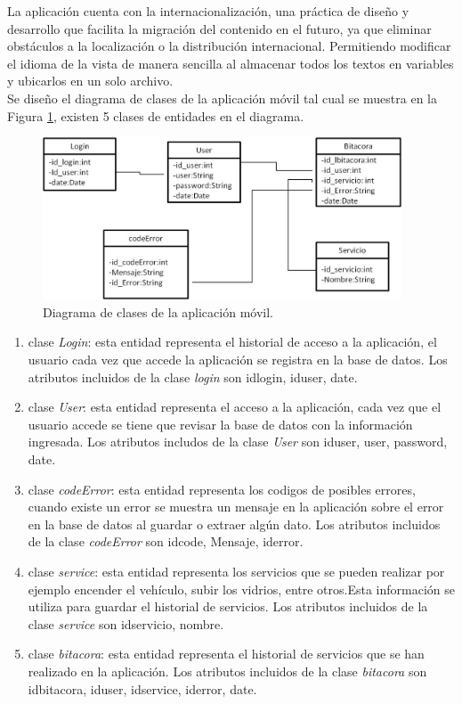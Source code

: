 La aplicación cuenta con la internacionalización, una práctica de diseño y desarrollo que facilita la migración del contenido en el futuro, ya que eliminar obstáculos a la localización o la distribución internacional. Permitiendo modificar el idioma de la vista de manera sencilla al almacenar todos los textos en variables y ubicarlos en un solo archivo.\\

Se diseño el diagrama de clases de la aplicación móvil tal cual se muestra en la Figura \ref{diaclas}, existen 5 clases de entidades en el diagrama. 
%
\begin{figure}[H]
\centering
\includegraphics[width=0.95\textwidth]{metodologia/DClases.jpg}
\caption{Diagrama de clases de la aplicación móvil.}
\label{diaclas}
\end{figure}
%
\begin{enumerate}
\item  clase \textit{Login}: esta entidad representa el historial de acceso a la aplicación, el usuario cada vez que accede la aplicación se registra en la base de datos. Los atributos incluidos de la clase \textit{login} son idlogin, iduser, date.
\item clase \textit{User}: esta entidad representa el acceso a la aplicación, cada vez que el usuario accede se tiene que revisar la base de datos con la información ingresada. Los atributos includos de la clase \textit{User} son iduser, user, password, date.
\item clase \textit{codeError}: esta entidad representa los codigos de posibles errores, cuando existe un error se muestra un mensaje en la aplicación sobre el error en la base de datos al guardar o extraer algún dato. Los atributos incluidos de la clase \textit{codeError} son idcode, Mensaje, iderror.
\item clase \textit{service}: esta entidad representa los servicios que se pueden realizar por ejemplo encender el vehículo, subir los vidrios, entre otros.Esta información se utiliza para guardar el historial de servicios. Los atributos incluidos de la clase \textit{service} son idservicio, nombre.
\item clase \textit{bitacora}: esta entidad representa el historial de servicios que se han realizado en la aplicación. Los atributos incluidos de la clase \textit{bitacora} son idbitacora, iduser, idservice, iderror, date.
\end{enumerate}
